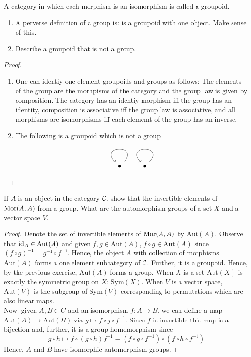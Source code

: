 
\begin{exercise}
    A category in which each morphism is an isomorphism is called a groupoid. 
    \begin{enumerate}[label = (\alph*)]
        \item A perverse definition of a group is: is a groupoid with one object. Make sense of this. 
        \item Describe a groupoid that is not a group. 
    \end{enumerate}
\end{exercise}

\begin{proof} \mbox{}
    \begin{enumerate}[label = (\alph*)]
        \item One can identiy one element groupoids and groups as follows: The elements of the group are the morhpisms of the category and the group law is given by composition. The category has an identiy morphism iff the group has an identity, composition is associative iff the group law is associative, and all morphisms are isomorphisms iff each elememt of the group has an inverse.
        \item The following is a groupoid which is not a group 
        \[ \begin{tikzcd}
            \bullet \arrow[loop] & \bullet \arrow[loop]
        \end{tikzcd} \]
    \end{enumerate}
\end{proof}

\begin{exercise}
    If $A$ is an object in the category $\mathcal{C}$, show that the invertible elements of $\text{Mor}(A, A)$ from a group. What are the automorphism groups of a set $X$ and a vector space $V$. 
\end{exercise}

\begin{proof}
    Denote the set of invertible elements of $\text{Mor}(A, A)$ by $\text{Aut}(A)$. Observe that $\text{id}_A \in \text{Aut}(A)$ and given $f, g \in \text{Aut}(A)$, $f \circ g \in \text{Aut}(A)$ since $(f \circ g)^{-1}  =g^{-1} \circ f^{-1}$. Hence, the object $A$ with collection of morphisms $\text{Aut}(A)$ forms a one element subcategory of $\mathcal{C}$. Further, it is a groupoid. Hence, by the previous exercise, $\text{Aut}(A)$ forms a group. When $X$ is a set $\text{Aut}(X)$ is exactly the symmetric group on $X$: $\text{Sym}(X)$. When $V$ is a vector space, $\text{Aut}(V)$ is the subgroup of $\text{Sym}(V)$ corresponding to permutations which are also linear maps. \\ 
    Now, given $A, B \in C$ and an isomorphism $f: A \to B$, we can define a map $\text{Aut}(A) \to \text{Aut}(B)$ via $g \mapsto f \circ g \circ f^{-1}$. Since $f$ is invertible this map is a bijection and, further, it is a group homomorphism since 
    \[ g \circ h \mapsto f \circ (g \circ h) f^{-1} = (f \circ g \circ f^{-1}) \circ (f \circ h \circ f^{-1}) \]
    Hence, $A$ and $B$ have isomorphic automorphism groups. 
\end{proof}

